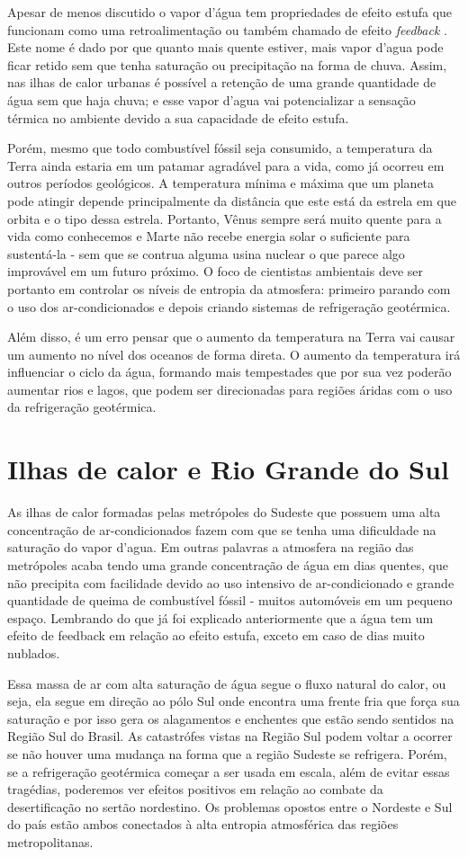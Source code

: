 Apesar de menos discutido o vapor d'água tem propriedades de efeito estufa que funcionam como uma retroalimentação ou também chamado de efeito \textit{feedback} \cite{Soden}. Este nome é dado por que quanto mais quente estiver, mais vapor d'agua pode ficar retido sem que tenha saturação ou precipitação na forma de chuva. Assim, nas ilhas de calor urbanas é possível a retenção de uma grande quantidade de água sem que haja chuva; e esse vapor d'agua vai potencializar a sensação térmica no ambiente devido a sua capacidade de efeito estufa.

Porém, mesmo que todo combustível fóssil seja consumido, a temperatura da Terra ainda estaria em um patamar agradável para a vida, como já ocorreu em outros períodos geológicos. A temperatura mínima e máxima que um planeta pode atingir depende principalmente da distância que este está da estrela em que orbita e o tipo dessa estrela. Portanto, Vênus sempre será muito quente para a vida como conhecemos e Marte não recebe energia solar o suficiente para sustentá-la - sem que se contrua alguma usina nuclear o que parece algo improvável em um futuro próximo. O foco de cientistas ambientais deve ser portanto em controlar os níveis de entropia da atmosfera: primeiro parando com o uso dos ar-condicionados e depois criando sistemas de refrigeração geotérmica.

Além disso, é um erro pensar que o aumento da temperatura na Terra vai causar um aumento no nível dos oceanos de forma direta. O aumento da temperatura irá influenciar o ciclo da água, formando mais tempestades que por sua vez poderão aumentar rios e lagos, que podem ser direcionadas para regiões áridas com o uso da refrigeração geotérmica.

\section{Ilhas de calor e Rio Grande do Sul}

As ilhas de calor formadas pelas metrópoles do Sudeste que possuem uma alta concentração de ar-condicionados fazem com que se tenha uma dificuldade na saturação do vapor d'agua. Em outras palavras a atmosfera na região das metrópoles acaba tendo uma grande concentração de água em dias quentes, que não precipita com facilidade devido ao uso intensivo de ar-condicionado e grande quantidade de queima de combustível fóssil - muitos automóveis em um pequeno espaço. Lembrando do que já foi explicado anteriormente que a água tem um efeito de feedback em relação ao efeito estufa, exceto em caso de dias muito nublados.

Essa massa de ar com alta saturação de água segue o fluxo natural do calor, ou seja, ela segue em direção ao pólo Sul onde encontra uma frente fria que força sua saturação e por isso gera os alagamentos e enchentes que estão sendo sentidos na Região Sul do Brasil. As catastrófes vistas na Região Sul podem voltar a ocorrer se não houver uma mudança na forma que a região Sudeste se refrigera. Porém, se a refrigeração geotérmica começar a ser usada em escala, além de evitar essas tragédias, poderemos ver efeitos positivos em relação ao combate da desertificação no sertão nordestino. Os problemas opostos entre o Nordeste e Sul do país estão ambos conectados à alta entropia atmosférica das regiões metropolitanas.